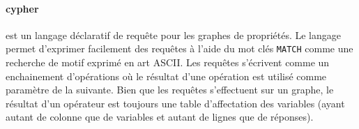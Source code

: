 \paragraph{\gls{cypher}} est un langage déclaratif de requête pour les graphes de propriétés.
Le langage permet d'exprimer facilement des requêtes à l'aide du mot clés \verb|MATCH| comme une recherche de motif exprimé en art ASCII.
Les requêtes s'écrivent comme un enchainement d'opérations où le résultat d'une opération est utilisé comme paramètre de la suivante.
Bien que les requêtes s'effectuent sur un graphe, le résultat d'un opérateur est toujours une table d'affectation des variables (ayant autant de colonne que de variables et autant de lignes que de réponses).
